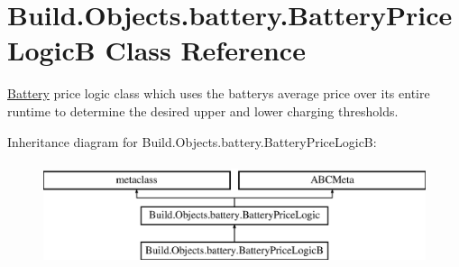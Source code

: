 \hypertarget{class_build_1_1_objects_1_1battery_1_1_battery_price_logic_b}{}\section{Build.\+Objects.\+battery.\+Battery\+Price\+LogicB Class Reference}
\label{class_build_1_1_objects_1_1battery_1_1_battery_price_logic_b}


\hyperlink{class_build_1_1_objects_1_1battery_1_1_battery}{Battery} price logic class which uses the battery\textquotesingle{}s average price over its entire runtime to determine the desired upper and lower charging thresholds.  


Inheritance diagram for Build.\+Objects.\+battery.\+Battery\+Price\+LogicB\+:\begin{figure}[H]
\begin{center}
\leavevmode
\includegraphics[height=3.000000cm]{class_build_1_1_objects_1_1battery_1_1_battery_price_logic_b}
\end{center}
\end{figure}
